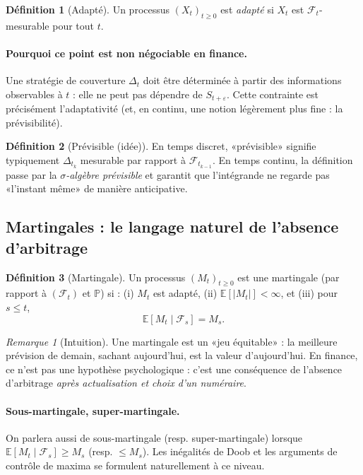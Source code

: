 \documentclass[11pt,a4paper]{report}
\theoremstyle{definition}
\newtheorem{definition}{Définition}[chapter]
\theoremstyle{plain}
\theoremstyle{remark}
\newtheorem{remark}{Remarque}[chapter]
\newcommand{\E}{\mathbb{E}}
\newcommand{\1}{\mathbf{1}}
\newcommand{\Pmeas}{\mathbb{P}}
\newcommand{\F}{\mathcal{F}}
\begin{document}
\begin{definition}[Adapté]
Un processus $(X_t)_{t\ge 0}$ est \emph{adapté} si $X_t$ est $\F_t$-mesurable pour tout $t$.
\end{definition}

\paragraph{Pourquoi ce point est non négociable en finance.}
Une stratégie de couverture $\Delta_t$ doit être déterminée à partir des informations observables à $t$ : elle ne peut pas dépendre de $S_{t+\varepsilon}$.
Cette contrainte est précisément l'adaptativité (et, en continu, une notion légèrement plus fine : la prévisibilité).

\begin{definition}[Prévisible (idée)]
En temps discret, «prévisible» signifie typiquement $\Delta_{t_{k}}$ mesurable par rapport à $\F_{t_{k-1}}$.
En temps continu, la définition passe par la \emph{$\sigma$-algèbre prévisible} et garantit que l'intégrande ne regarde pas «l'instant même» de manière anticipative.
\end{definition}

\subsection*{Martingales : le langage naturel de l'absence d'arbitrage}
\begin{definition}[Martingale]
Un processus $(M_t)_{t\ge 0}$ est une martingale (par rapport à $(\F_t)$ et $\Pmeas$) si :
(i) $M_t$ est adapté, (ii) $\E[|M_t|]<\infty$, et (iii) pour $s\le t$,
\[
\E[M_t\mid \F_s]=M_s.
\]
\end{definition}

\begin{remark}[Intuition]
Une martingale est un «jeu équitable» : la meilleure prévision de demain, sachant aujourd'hui, est la valeur d'aujourd'hui.
En finance, ce n'est pas une hypothèse psychologique : c'est une conséquence de l'absence d'arbitrage \emph{après actualisation et choix d'un numéraire}.
\end{remark}

\paragraph{Sous-martingale, super-martingale.}
On parlera aussi de sous-martingale (resp. super-martingale) lorsque $\E[M_t\mid \F_s]\ge M_s$ (resp. $\le M_s$). Les inégalités de Doob et les arguments de contrôle de maxima se formulent naturellement à ce niveau.
\end{document}
